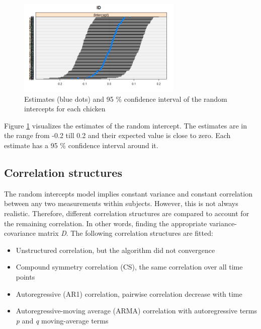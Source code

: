 \documentclass{article}
\begin{document}
\begin{figure}
    \centering
    \includegraphics[width =0.7\textwidth]{Random_intercept_r1.png}
    \caption{Estimates (blue dots) and 95 \% confidence interval of the random intercepts for each chicken}
    \label{fig:random_int}
\end{figure}

Figure \ref{fig:random_int} visualizes the estimates of the random intercept. The estimates are in the range from -0.2 till 0.2 and their expected value is close to zero. Each estimate has a 95 \% confidence interval around it. 

\subsection{Correlation structures}
The random intercepts model implies constant variance and constant correlation between any two measurements within subjects. However, this is not always realistic. Therefore, different correlation structures are compared to account for the remaining correlation. In other words, finding the appropriate variance-covariance matrix \textit{D}. The following correlation structures are fitted:
\begin{itemize}
    \item Unstructured correlation, but the algorithm did not convergence 
    \item Compound symmetry correlation (CS), the same correlation over all time points
    \item Autoregressive (AR1) correlation, pairwise correlation decrease with time
    \item Autoregressive-moving average (ARMA) correlation with  autoregressive terms \textit{p} and \textit{q} moving-average terms
\end{itemize}
\end{document}
